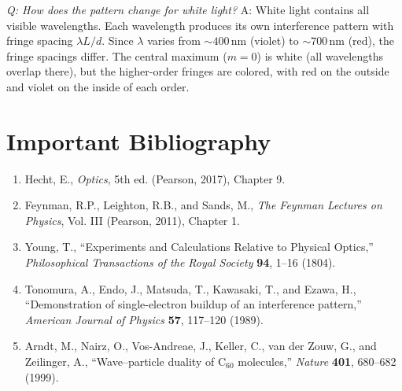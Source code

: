\textit{Q: How does the pattern change for white light?}
A: White light contains all visible wavelengths. Each wavelength produces its own interference pattern with fringe spacing $\lambda L/d$. Since $\lambda$ varies from $\sim 400\,\text{nm}$ (violet) to $\sim 700\,\text{nm}$ (red), the fringe spacings differ. The central maximum ($m = 0$) is white (all wavelengths overlap there), but the higher-order fringes are colored, with red on the outside and violet on the inside of each order.
\section*{Important Bibliography}
\begin{enumerate}
\item Hecht, E., \textit{Optics}, 5th ed. (Pearson, 2017), Chapter 9.
\item Feynman, R.P., Leighton, R.B., and Sands, M., \textit{The Feynman Lectures on Physics}, Vol. III (Pearson, 2011), Chapter 1.
\item Young, T., ``Experiments and Calculations Relative to Physical Optics,'' \textit{Philosophical Transactions of the Royal Society} \textbf{94}, 1--16 (1804).
\item Tonomura, A., Endo, J., Matsuda, T., Kawasaki, T., and Ezawa, H., ``Demonstration of single-electron buildup of an interference pattern,'' \textit{American Journal of Physics} \textbf{57}, 117--120 (1989).
\item Arndt, M., Nairz, O., Vos-Andreae, J., Keller, C., van der Zouw, G., and Zeilinger, A., ``Wave--particle duality of C$_{60}$ molecules,'' \textit{Nature} \textbf{401}, 680--682 (1999).
\end{enumerate}


